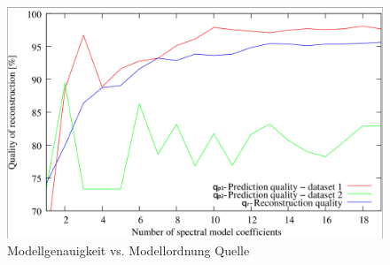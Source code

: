 \begin{figure}[!ht]
	\begin{center}
		\includegraphics[width=0.7\linewidth]{Abbildungen/predict_reconstruct_error}
		\caption{Modellgenauigkeit vs. Modellordnung Quelle \cite{Krajnik.2014}}
		\label{fig.predict_reconstruct_error}	
	\end{center}
	
\end{figure}


